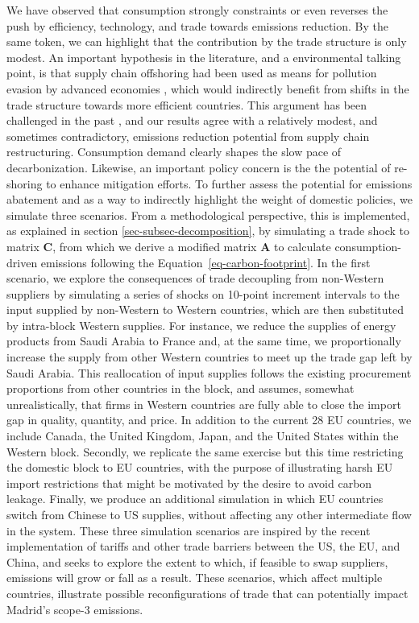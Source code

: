 \documentclass[
  10pt,
  twocolumn]{aft}
\begin{document}
We have observed that consumption strongly constraints or even reverses
the push by efficiency, technology, and trade towards emissions
reduction. By the same token, we can highlight that the contribution by
the trade structure is only modest. An important hypothesis in the
literature, and a environmental talking point, is that supply chain
offshoring had been used as means for pollution evasion by advanced
economies \citep{levinsonUnmaskingPollutionHave2008}, which would
indirectly benefit from shifts in the trade structure towards more
efficient countries. This argument has been challenged in the past
\citep{artoDriversGrowthGlobal2014}, and our results agree with a
relatively modest, and sometimes contradictory, emissions reduction
potential from supply chain restructuring. Consumption demand clearly
shapes the slow pace of decarbonization. Likewise, an important policy
concern is the the potential of re-shoring to enhance mitigation
efforts. To further assess the potential for emissions abatement and as
a way to indirectly highlight the weight of domestic policies, we
simulate three scenarios. From a methodological perspective, this is
implemented, as explained in section \ref{sec-subsec-decomposition}, by
simulating a trade shock to matrix \(\mathbf{C}\), from which we derive
a modified matrix \(\mathbf{A}\) to calculate consumption-driven
emissions following the Equation~\ref{eq-carbon-footprint}. In the first
scenario, we explore the consequences of trade decoupling from
non-Western suppliers by simulating a series of shocks on 10-point
increment intervals to the input supplied by non-Western to Western
countries, which are then substituted by intra-block Western supplies.
For instance, we reduce the supplies of energy products from Saudi
Arabia to France and, at the same time, we proportionally increase the
supply from other Western countries to meet up the trade gap left by
Saudi Arabia. This reallocation of input supplies follows the existing
procurement proportions from other countries in the block, and assumes,
somewhat unrealistically, that firms in Western countries are fully able
to close the import gap in quality, quantity, and price. In addition to
the current 28 EU countries, we include Canada, the United Kingdom,
Japan, and the United States within the Western block. Secondly, we
replicate the same exercise but this time restricting the domestic block
to EU countries, with the purpose of illustrating harsh EU import
restrictions that might be motivated by the desire to avoid carbon
leakage. Finally, we produce an additional simulation in which EU
countries switch from Chinese to US supplies, without affecting any
other intermediate flow in the system. These three simulation scenarios
are inspired by the recent implementation of tariffs and other trade
barriers between the US, the EU, and China, and seeks to explore the
extent to which, if feasible to swap suppliers, emissions will grow or
fall as a result. These scenarios, which affect multiple countries,
illustrate possible reconfigurations of trade that can potentially
impact Madrid's scope-3 emissions.
\end{document}
